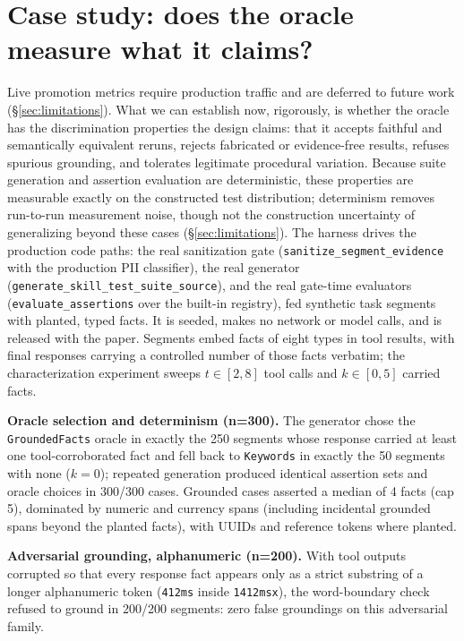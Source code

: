 \documentclass{article}
\newcommand{\code}[1]{\texttt{\small #1}}
\begin{document}
\section{Case study: does the oracle measure what it claims?}
\label{sec:casestudy}

Live promotion metrics require production traffic and are deferred to future work (\S\ref{sec:limitations}). What we can establish now, rigorously, is whether the oracle has the discrimination properties the design claims: that it accepts faithful and semantically equivalent reruns, rejects fabricated or evidence-free results, refuses spurious grounding, and tolerates legitimate procedural variation. Because suite generation and assertion evaluation are deterministic, these properties are measurable exactly on the constructed test distribution; determinism removes run-to-run measurement noise, though not the construction uncertainty of generalizing beyond these cases (\S\ref{sec:limitations}). The harness drives the production code paths: the real sanitization gate (\code{sanitize\_segment\_evidence} with the production PII classifier), the real generator (\code{generate\_skill\_test\_suite\_source}), and the real gate-time evaluators (\code{evaluate\_assertions} over the built-in registry), fed synthetic task segments with planted, typed facts. It is seeded, makes no network or model calls, and is released with the paper. Segments embed facts of eight types in tool results, with final responses carrying a controlled number of those facts verbatim; the characterization experiment sweeps $t \in [2,8]$ tool calls and $k \in [0,5]$ carried facts.

\textbf{Oracle selection and determinism (n=300).} The generator chose the \code{GroundedFacts} oracle in exactly the 250 segments whose response carried at least one tool-corroborated fact and fell back to \code{Keywords} in exactly the 50 segments with none ($k{=}0$); repeated generation produced identical assertion sets and oracle choices in 300/300 cases. Grounded cases asserted a median of 4 facts (cap 5), dominated by numeric and currency spans (including incidental grounded spans beyond the planted facts), with UUIDs and reference tokens where planted.

\textbf{Adversarial grounding, alphanumeric (n=200).} With tool outputs corrupted so that every response fact appears only as a strict substring of a longer alphanumeric token (\code{412ms} inside \code{1412msx}), the word-boundary check refused to ground in 200/200 segments: zero false groundings on this adversarial family.
\end{document}
